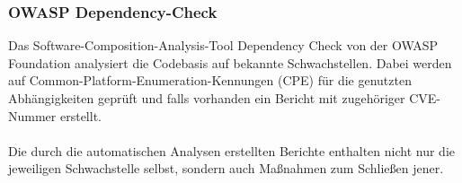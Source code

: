 \subsubsection{OWASP Dependency-Check} \label{sec:OWASP-Dependency-Check}
Das Software-Composition-Analysis-Tool Dependency Check von der OWASP Foundation analysiert die Codebasis auf bekannte Schwachstellen.
Dabei werden auf Common-Platform-Enumeration-Kennungen (CPE) für die genutzten Abhängigkeiten geprüft und falls vorhanden ein Bericht mit zugehöriger CVE-Nummer erstellt.
\\ \\
Die durch die automatischen Analysen erstellten Berichte enthalten nicht nur die jeweiligen Schwachstelle selbst, sondern auch Maßnahmen zum Schließen jener.